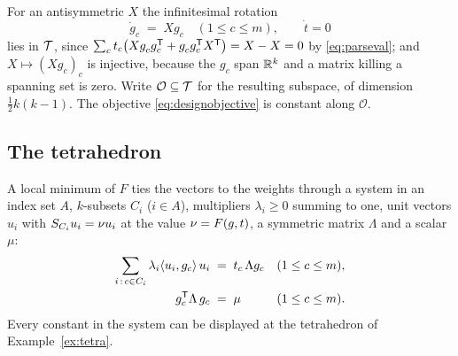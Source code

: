 For an antisymmetric $X$ the infinitesimal rotation
\begin{equation}\label{eq:orbit}
  \dot g_c\;=\;Xg_c\quad(1\le c\le m),\qquad \dot t=0
\end{equation}
lies in $\mathcal{T}$, since
$\sum_c t_c\bigl(Xg_c^{\vphantom{\mathsf{T}}}g_c\tp
+g_c^{\vphantom{\mathsf{T}}}g_c\tp X\tp\bigr)=X-X=0$ by \eqref{eq:parseval}; and
$X\mapsto(Xg_c)_c$ is injective, because the $g_c$ span $\mathbb{R}^k$ and a
matrix killing a spanning set is zero.  Write $\mathcal{O}\subseteq \mathcal{T}$
for the resulting subspace, of dimension $\tfrac12k(k-1)$.  The
objective \eqref{eq:designobjective} is constant along $\mathcal{O}$.

\subsection{The tetrahedron}\label{sec:tetracalib}

A local minimum of $F$ ties the vectors to the weights through a system in
an index set $A$, $k$-subsets $C_i$ ($i\in A$), multipliers
$\lambda_i\ge0$ summing to one, unit vectors $u_i$ with
$S_{C_i}u_i=\nu u_i$ at the value $\nu=F(g,t)$, a symmetric matrix
$\Lambda$ and a scalar $\mu$:
\begin{align}
  \sum_{i\,:\,c\in C_i}\lambda_i\langle u_i,g_c\rangle\,u_i
    &\;=\;t_c\,\Lambda g_c &&(1\le c\le m), \label{eq:statg}\\
  g_c^{\mathsf{T}}\Lambda\,g_c &\;=\;\mu &&(1\le c\le m). \label{eq:statt}
\end{align}
Every constant in the system can be displayed at the tetrahedron of
Example~\ref{ex:tetra}.

